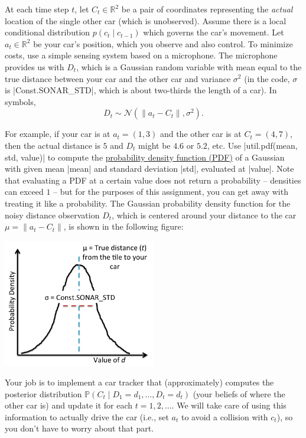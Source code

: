 At each time step $t$, let $C_t \in \mathbb R^2$ be a pair of coordinates representing the {\em actual} location of the single other car (which is
unobserved). Assume there is a local conditional distribution $p(c_t \mid
c_{t-1})$ which governs the car's movement. Let $a_t \in \mathbb R^2$ be your
car's position, which you observe and also control. To minimize costs, use a
simple sensing system based on a microphone. The microphone provides us with
$D_t$, which is a Gaussian random variable with mean equal to the true distance
between your car and the other car and variance $\sigma^2$ (in the code,
$\sigma$ is |Const.SONAR_STD|, which is about two-thirds the length of a car).
In symbols,
\[D_t \sim \mathcal N(\|a_t - C_t\|, \sigma^2).\]

For example, if your car is at $a_t = (1,3)$ and the other car is at $C_t =
(4,7)$, then the actual distance is $5$ and $D_t$ might be $4.6$ or $5.2$, etc.
Use |util.pdf(mean, std, value)| to compute the \href{http://en.wikipedia.org/wiki/Probability_density_function}{probability density function (PDF)} of a Gaussian
with given mean |mean| and standard deviation |std|, evaluated at |value|. Note
that evaluating a PDF at a certain value does not return a probability --
densities can exceed $1$ -- but for the purposes of this assignment, you can get
away with treating it like a probability. The Gaussian probability density
function for the noisy distance observation $D_t$, which is centered around your
distance to the car $\mu = \|a_t - C_t\|$, is shown in the following figure:
\begin{center}
\includegraphics[width=0.5\textwidth]{media/pdf.png}
\end{center}

Your job is to implement a car tracker that (approximately) computes the
posterior distribution $\mathbb P(C_t \mid D_1 = d_1, \dots, D_t = d_t)$ (your
beliefs of where the other car is) and update it for each $t = 1, 2, \dots$.  We
will take care of using this information to actually drive the car (i.e., set
$a_t$ to avoid a collision with $c_t$), so you don't have to worry about that
part.

